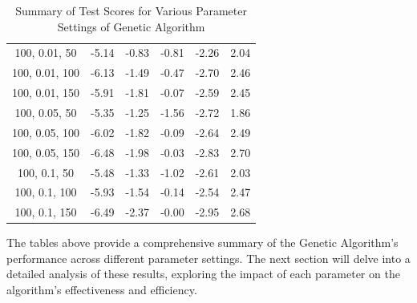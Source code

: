 \documentclass{article}
\begin{document}
\begin{table}[H]
{\begin{tabular}{|c|c|c|c|c|c|}
                100, 0.01, 50              & -5.14                      & -0.83                      & -0.81                      & -2.26                    & 2.04                    \\
                100, 0.01, 100             & -6.13                      & -1.49                      & -0.47                      & -2.70                    & 2.46                    \\
                100, 0.01, 150             & -5.91                      & -1.81                      & -0.07                      & -2.59                    & 2.45                    \\
                100, 0.05, 50              & -5.35                      & -1.25                      & -1.56                      & -2.72                    & 1.86                    \\
                100, 0.05, 100             & -6.02                      & -1.82                      & -0.09                      & -2.64                    & 2.49                    \\
                100, 0.05, 150             & -6.48                      & -1.98                      & -0.03                      & -2.83                    & 2.70                    \\
                100, 0.1, 50               & -5.48                      & -1.33                      & -1.02                      & -2.61                    & 2.03                    \\
                100, 0.1, 100              & -5.93                      & -1.54                      & -0.14                      & -2.54                    & 2.47                    \\
                100, 0.1, 150              & -6.49                      & -2.37                      & -0.00                      & -2.95                    & 2.68                    \\
                \hline
            \end{tabular}
        }
        \caption{Summary of Test Scores for Various Parameter Settings of Genetic Algorithm}
        \label{tab:ga_summary_test_scores}
    \end{table}


    The tables above provide a comprehensive summary of the Genetic Algorithm's performance across different parameter settings. The next section will delve into a detailed analysis of these results, exploring the impact of each parameter on the algorithm's effectiveness and efficiency.
\end{document}
